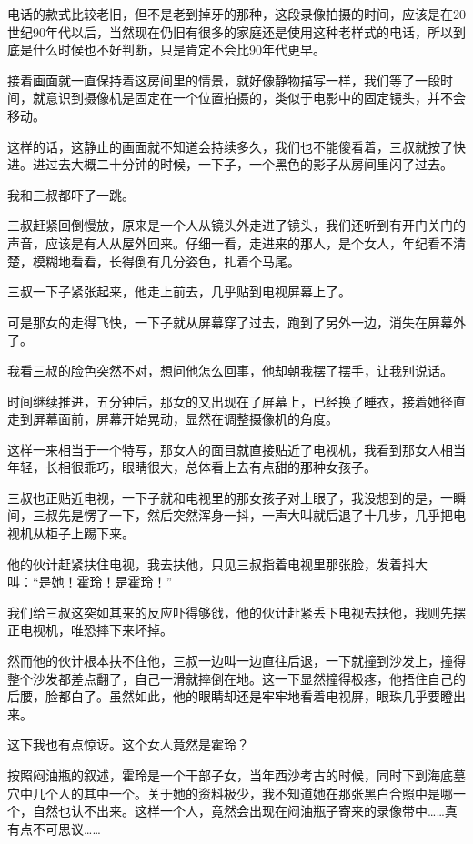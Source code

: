 电话的款式比较老旧，但不是老到掉牙的那种，这段录像拍摄的时间，应该是在20世纪90年代以后，当然现在仍旧有很多的家庭还是使用这种老样式的电话，所以到底是什么时候也不好判断，只是肯定不会比90年代更早。

接着画面就一直保持着这房间里的情景，就好像静物描写一样，我们等了一段时间，就意识到摄像机是固定在一个位置拍摄的，类似于电影中的固定镜头，并不会移动。

这样的话，这静止的画面就不知道会持续多久，我们也不能傻看着，三叔就按了快进。进过去大概二十分钟的时候，一下子，一个黑色的影子从房间里闪了过去。

我和三叔都吓了一跳。

三叔赶紧回倒慢放，原来是一个人从镜头外走进了镜头，我们还听到有开门关门的声音，应该是有人从屋外回来。仔细一看，走进来的那人，是个女人，年纪看不清楚，模糊地看看，长得倒有几分姿色，扎着个马尾。

三叔一下子紧张起来，他走上前去，几乎贴到电视屏幕上了。

可是那女的走得飞快，一下子就从屏幕穿了过去，跑到了另外一边，消失在屏幕外了。

我看三叔的脸色突然不对，想问他怎么回事，他却朝我摆了摆手，让我别说话。

时间继续推进，五分钟后，那女的又出现在了屏幕上，已经换了睡衣，接着她径直走到屏幕面前，屏幕开始晃动，显然在调整摄像机的角度。

这样一来相当于一个特写，那女人的面目就直接贴近了电视机，我看到那女人相当年轻，长相很乖巧，眼睛很大，总体看上去有点甜的那种女孩子。

三叔也正贴近电视，一下子就和电视里的那女孩子对上眼了，我没想到的是，一瞬间，三叔先是愣了一下，然后突然浑身一抖，一声大叫就后退了十几步，几乎把电视机从柜子上踢下来。

他的伙计赶紧扶住电视，我去扶他，只见三叔指着电视里那张脸，发着抖大叫：“是她！霍玲！是霍玲！”

我们给三叔这突如其来的反应吓得够戗，他的伙计赶紧丢下电视去扶他，我则先摆正电视机，唯恐摔下来坏掉。

然而他的伙计根本扶不住他，三叔一边叫一边直往后退，一下就撞到沙发上，撞得整个沙发都差点翻了，自己一滑就摔倒在地。这一下显然撞得极疼，他捂住自己的后腰，脸都白了。虽然如此，他的眼睛却还是牢牢地看着电视屏，眼珠几乎要瞪出来。

这下我也有点惊讶。这个女人竟然是霍玲？

按照闷油瓶的叙述，霍玲是一个干部子女，当年西沙考古的时候，同时下到海底墓穴中几个人的其中一个。关于她的资料极少，我不知道她在那张黑白合照中是哪一个，自然也认不出来。这样一个人，竟然会出现在闷油瓶子寄来的录像带中……真有点不可思议……

